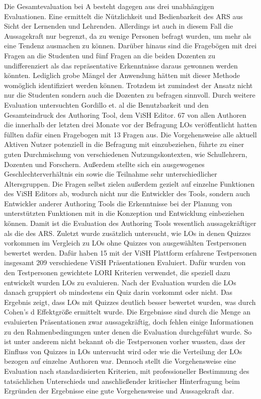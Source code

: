 \documentclass[conference]{IEEEtran}
\begin{document}
Die Gesamtevaluation bei A besteht dagegen aus drei unabhängigen Evaluationen. Eine ermittelt die Nützlichkeit und Bedienbarkeit des ARS aus Sicht der Lernenden und Lehrenden. Allerdings ist auch in diesem Fall die Aussagekraft nur begrenzt, da zu wenige Personen befragt wurden, um mehr als eine Tendenz ausmachen zu können. Darüber hinaus sind die Fragebögen mit drei Fragen an die Studenten und fünf Fragen an die beiden Dozenten zu undifferenziert als das repräsentative Erkenntnisse daraus gewonnen werden könnten. Lediglich grobe Mängel der Anwendung hätten mit dieser Methode womöglich identifiziert werden können. Trotzdem ist zumindest der Ansatz nicht nur die Studenten sondern auch die Dozenten zu befragen sinnvoll.
Durch weitere Evaluation untersuchten Gordillo et. al die Benutzbarkeit und den Gesamteindruck des Authoring Tool, dem ViSH Editor. 67 von allen Authoren die innerhalb der letzten drei Monate vor der Befragung LOs veröffentlicht hatten füllten dafür einen Fragebogen mit 13 Fragen aus. Die Vorgehensweise alle aktuell Aktiven Nutzer potenziell in die Befragung mit einzubeziehen, führte zu einer guten Durchmischung von verschiedenen Nutzungskontexten, wie Schullehrern, Dozenten und Forschern. Außerdem stellte sich ein ausgewogenes Geschlechterverhältnis ein sowie die Teilnahme sehr unterschiedlicher Altersgruppen. Die Fragen selbst zielen außerdem gezielt auf einzelne Funktionen des ViSH Editors ab, wodurch nicht nur die Entwickler des Tools, sondern auch Entwickler anderer Authoring Tools die Erkenntnisse bei der Planung von unterstützten Funktionen mit in die Konzeption und Entwicklung einbeziehen können. Damit ist die Evaluation des Authoring Tools wesentlich aussagekräftiger als die des ARS.
Zuletzt wurde zusätzlich untersucht, wie LOs in denen Quizzes vorkommen im Vergleich zu LOs ohne Quizzes von ausgewählten Testpersonen bewertet werden. Dafür haben 15 mit der ViSH Plattform erfahrene Testpersonen insgesamt 209 verschiedene ViSH Präsentationen Evaluiert. Dafür wurden von den Testpersonen gewichtete LORI Kriterien verwendet, die speziell dazu entwickelt wurden LOs zu evaluieren. Nach der Evaluation wurden die LOs danach gruppiert ob mindestens ein Quiz darin vorkommt oder nicht. Das Ergebnis zeigt, dass LOs mit Quizzes deutlich besser bewertet wurden, was durch Cohen's d Effektgröße ermittelt wurde. Die Ergebnisse sind durch die Menge an evaluierten Präsentationen zwar aussagekräftig, doch fehlen einige Informationen zu den Rahmenbedingungen unter denen die Evaluation durchgeführt wurde. So ist unter anderem nicht bekannt ob die Testpersonen vorher wussten, dass der Einfluss von Quizzes in LOs untersucht wird oder wie die Verteilung der LOs bezogen auf einzelne Authoren war. Dennoch stellt die Vorgehensweise eine Evaluation nach standardisierten Kriterien, mit professioneller Bestimmung des tatsächlichen Unterschieds und anschließender kritischer Hinterfragung beim Ergründen der Ergebnisse eine gute Vorgehensweise und Aussagekraft dar.
\end{document}
